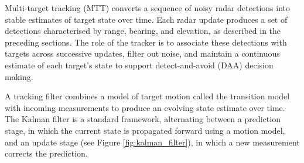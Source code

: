 
Multi-target tracking (MTT) converts a sequence of noisy radar detections into stable 
estimates of target state over time. Each radar update produces a set of detections 
characterised by range, bearing, and elevation, as described in the preceding sections. 
The role of the tracker is to associate these detections with targets across 
successive updates, filter out noise, and maintain a continuous estimate of each 
target's state to support detect-and-avoid (DAA) decision making.

A tracking filter combines a model of target motion called the transition model with 
incoming measurements to produce an evolving state estimate over time. The Kalman 
filter \cite{jazwinski1970stochastic} is 
a standard framework, alternating between a prediction stage, in which the current 
state is propagated forward using a motion model, and an update stage (see Figure 
\ref{fig:kalman_filter}), in which a new 
measurement corrects the prediction. 

